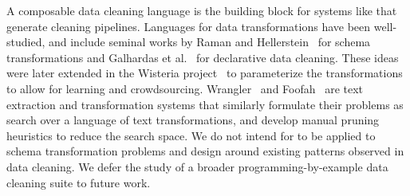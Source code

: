  A composable data cleaning language is the building block for systems like \sys that generate cleaning pipelines.   Languages for data transformations have been well-studied, and include seminal works by Raman and Hellerstein~\cite{raman2001potter} for schema transformations and Galhardas et al.~\cite{DBLP:conf/vldb/GalhardasFSSS01} for declarative data cleaning. These ideas were later extended in the Wisteria project~\cite{DBLP:journals/pvldb/HaasKWF015} to parameterize the transformations to allow for learning and crowdsourcing.   Wrangler~\cite{wrangler} and Foofah~\cite{jin2017foofah} are text extraction and transformation systems that similarly formulate their problems as search over a language of text transformations, and develop manual pruning heuristics to reduce the search space. We do not intend for \sys to be applied to schema transformation problems and design \sys around existing patterns observed in data cleaning.
We defer the study of a broader programming-by-example data cleaning suite to future work.



